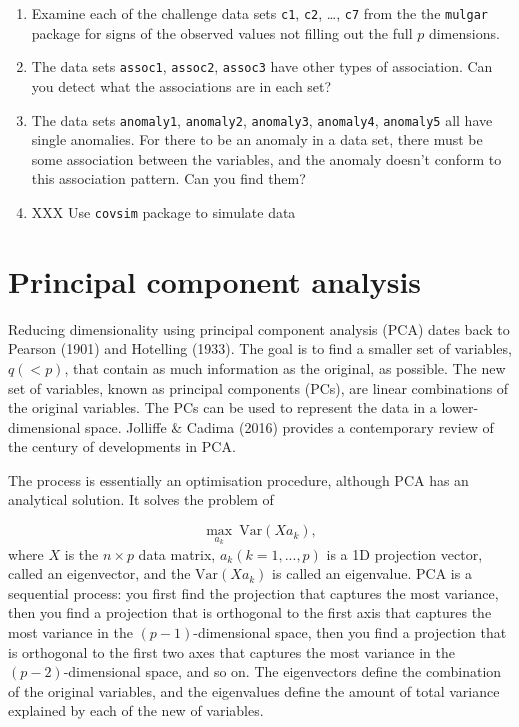 \documentclass[
  letterpaper,
]{krantz}
\begin{document}
\begin{enumerate}
\def\labelenumi{\arabic{enumi}.}
\setcounter{enumi}{3}
\item
  Examine each of the challenge data sets \texttt{c1}, \texttt{c2},
  \ldots, \texttt{c7} from the the \texttt{mulgar} package for signs of
  the observed values not filling out the full \(p\) dimensions.
\item
  The data sets \texttt{assoc1}, \texttt{assoc2}, \texttt{assoc3} have
  other types of association. Can you detect what the associations are
  in each set?
\item
  The data sets \texttt{anomaly1}, \texttt{anomaly2}, \texttt{anomaly3},
  \texttt{anomaly4}, \texttt{anomaly5} all have single anomalies. For
  there to be an anomaly in a data set, there must be some association
  between the variables, and the anomaly doesn't conform to this
  association pattern. Can you find them?
\item
  XXX Use \texttt{covsim} package to simulate data
\end{enumerate}

\chapter{Principal component
analysis}\label{principal-component-analysis}


Reducing dimensionality using principal component analysis (PCA) dates
back to Pearson (1901) and Hotelling (1933). The goal is to find a
smaller set of variables, \(q (< p)\), that contain as much information
as the original, as possible. The new set of variables, known as
principal components (PCs), are linear combinations of the original
variables. The PCs can be used to represent the data in a
lower-dimensional space. Jolliffe \& Cadima (2016) provides a
contemporary review of the century of developments in PCA.

The process is essentially an optimisation procedure, although PCA has
an analytical solution. It solves the problem of

\[
\max_{a_k} ~\text{Var} (Xa_k),
\] where \(X\) is the \(n \times p\) data matrix, \(a_k (k=1, ..., p)\)
is a 1D projection vector, called an eigenvector, and the
\(\text{Var} (Xa_k)\) is called an eigenvalue. PCA is a sequential
process: you first find the projection that captures the most variance,
then you find a projection that is orthogonal to the first axis that
captures the most variance in the \((p-1)\)-dimensional space, then you
find a projection that is orthogonal to the first two axes that captures
the most variance in the \((p-2)\)-dimensional space, and so on. The
eigenvectors define the combination of the original variables, and the
eigenvalues define the amount of total variance explained by each of the
new of variables. 
\end{document}
